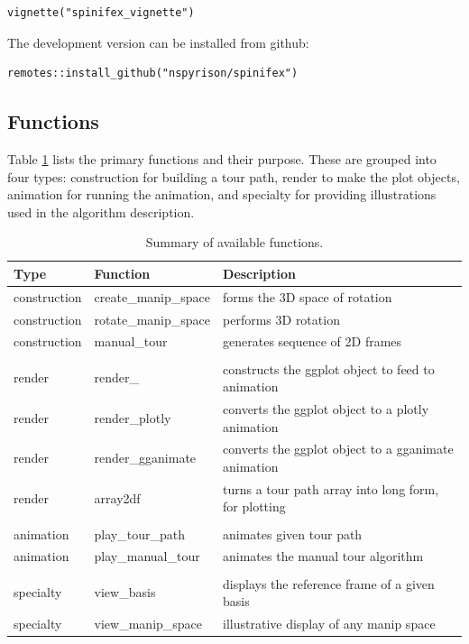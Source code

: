 \begin{verbatim}
vignette("spinifex_vignette")
\end{verbatim}

\noindent The development version can be installed from github:

\begin{verbatim}
remotes::install_github("nspyrison/spinifex") 
\end{verbatim}

\hypertarget{functions}{%
\subsection{Functions}\label{functions}}

Table \ref{tab:functionsTable} lists the primary functions and their
purpose. These are grouped into four types: construction for building a
tour path, render to make the plot objects, animation for running the
animation, and specialty for providing illustrations used in the
algorithm description.

\begin{Schunk}
\begin{table}[t]

\caption{\label{tab:functionsTable}Summary of available functions.}
\centering
\begin{tabular}{lll}
\toprule
Type & Function & Description\\
\midrule
construction & create\_manip\_space & forms the 3D space of rotation\\
construction & rotate\_manip\_space & performs 3D rotation\\
construction & manual\_tour & generates sequence of 2D frames\\
 &  & \\
render & render\_ & constructs the ggplot object to feed to animation\\
render & render\_plotly & converts the ggplot object to a plotly animation\\
render & render\_gganimate & converts the ggplot object to a gganimate  animation\\
render & array2df & turns a tour path array into long form, for plotting\\
 &  & \\
animation & play\_tour\_path & animates given tour path\\
animation & play\_manual\_tour & animates the manual tour algorithm\\
 &  & \\
specialty & view\_basis & displays the reference frame of a given basis\\
specialty & view\_manip\_space & illustrative display of any manip space\\
\bottomrule
\end{tabular}
\end{table}

\end{Schunk}

